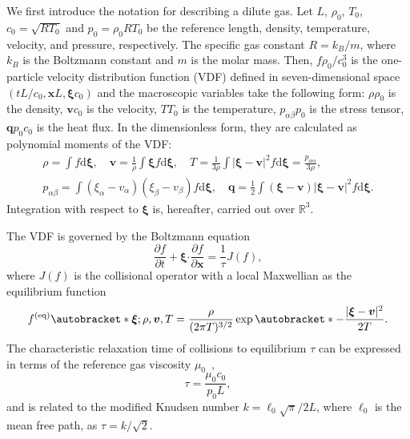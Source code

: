 \documentclass{elsarticle} %
\newcommand{\dd}{\mathrm{d}}
\newcommand{\pder}[2][]{\frac{\partial#1}{\partial#2}}
\DeclarePairedDelimiter\autobracket()       %
\newcommand{\br}[1]{\autobracket*{#1}}
\newcommand{\dxi}{\dd{\boldsymbol{\xi}}}
\newcommand{\bxi}{\boldsymbol{\xi}}
\newcommand{\bv}{\boldsymbol{v}}
\newcommand{\bq}{\boldsymbol{q}}
\newcommand{\bdot}{\boldsymbol{\cdot}}
\newcommand{\bx}{\boldsymbol{x}}
\newcommand{\equil}[1]{#1^\mathrm{(eq)}}
\newcommand{\refer}[1]{#1_0}
\begin{document}
We first introduce the notation for describing a dilute gas.
Let \(L\), \(\refer\rho\), \(\refer{T}\), \(\refer{c} = \sqrt{R\refer{T}}\) and \(\refer{p} = \refer{\rho}R\refer{T}\) be
the reference length, density, temperature, velocity, and pressure, respectively.
The specific gas constant \(R = k_B/m\), where \(k_B\) is the Boltzmann constant and \(m\) is the molar mass.
Then, \(f\refer{\rho}/\refer{c}^3\) is the one-particle velocity distribution function (VDF)
defined in seven-dimensional space \((tL/\refer{c}, \bx L, \bxi \refer{c})\) and
the macroscopic variables take the following form:
\(\rho\refer{\rho}\) is the density, \(\bv\refer{c}\) is the velocity, \(T\refer{T}\) is the temperature,
\(p_{\alpha\beta}\refer{p}\) is the stress tensor, \(\bq\refer{p}\refer{c}\) is the heat flux.
In the dimensionless form, they are calculated as polynomial moments of the VDF:
\begin{equation}\label{eq:macro}
    \begin{gathered}
    \rho = \int f \dxi, \quad
    \bv = \frac1{\rho} \int \bxi f \dxi, \quad
    T = \frac{1}{3\rho}\int|\bxi-\bv|^2f \dxi = \frac{p_{\alpha\alpha}}{3\rho}, \\
    p_{\alpha\beta} = \int(\xi_\alpha - v_\alpha)(\xi_\beta - v_\beta) f \dxi, \quad
    \bq = \frac12\int(\bxi-\bv)|\bxi-\bv|^2 f \dxi.
    \end{gathered}
\end{equation}
Integration with respect to \(\bxi\) is, hereafter, carried out over \(\mathbb{R}^3\).

The VDF is governed by the Boltzmann equation
\begin{equation}\label{eq:Boltzmann}
    \pder[f]{t} + \bxi\bdot\pder[f]{\bx} = \frac{1}{\tau} J(f),
\end{equation}
where \(J(f)\) is the collisional operator with a local Maxwellian as the equilibrium function
\begin{equation}\label{eq:equilibrium}
    \equil{f}\br{\bxi; \rho, \bv, T} = \frac{\rho}{(2\pi T)^{3/2}}\exp\br{-\frac{|\bxi-\bv|^2}{2T}}.
\end{equation}
The characteristic relaxation time of collisions to equilibrium \(\tau\)
can be expressed in terms of the reference gas viscosity \(\refer\mu\)~\cite{Cercignani2000, Sone2007},
\begin{equation}\label{eq:tau}
    \tau = \frac{\refer\mu\refer{c}}{\refer{p}L},
\end{equation}
and is related to the modified Knudsen number \(k=\ell_0\sqrt\pi/2L\), where \(\ell_0\) is the mean free path,
as \(\tau = k / \sqrt2\).
\end{document}
